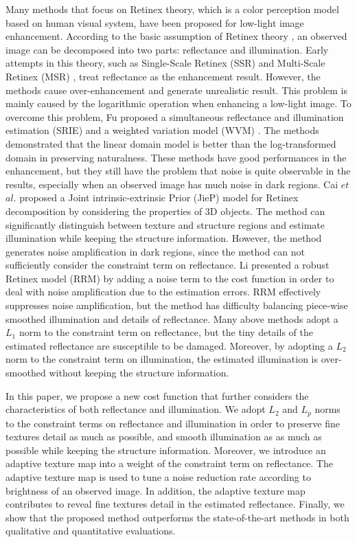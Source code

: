 Many methods that focus on Retinex theory, which is a color perception model based on human visual system, have been proposed for low-light image enhancement. According to the basic assumption of Retinex theory \cite{retinex}, an observed image can be decomposed into two parts: reflectance and illumination. Early attempts in this theory, such as Single-Scale Retinex (SSR) \cite{ssr} and Multi-Scale Retinex (MSR) \cite{msr}, treat reflectance as the enhancement result. However, the methods cause over-enhancement and generate unrealistic result. This problem is mainly caused by the logarithmic operation when enhancing a low-light image. To overcome this problem, Fu proposed a simultaneous reflectance and illumination estimation (SRIE) \cite{srie} and a weighted variation model (WVM) \cite{wvm}. The methods demonstrated that the linear domain model is better than the log-transformed domain in preserving naturalness. These methods have good performances in the enhancement, but they still have the problem that noise is quite observable in the results, especially when an observed image has much noise in dark regions. Cai $et$ $al$. \cite{jiep} proposed a Joint intrinsic-extrinsic Prior (JieP) model for Retinex decomposition by considering the properties of 3D objects. The method can significantly distinguish between texture and structure regions and estimate illumination while keeping the structure information. However, the method generates noise amplification in dark regions, since the method can not sufficiently consider the constraint term on reflectance. Li presented a robust Retinex model (RRM) \cite{rrm} by adding a noise term to the cost function in order to deal with noise amplification due to the estimation errors. RRM effectively suppresses noise amplification, but the method has difficulty balancing piece-wise smoothed illumination and details of reflectance. Many above methods adopt a $L_{1}$ norm to the constraint term on reflectance, but the tiny details of the estimated reflectance are susceptible to be damaged. Moreover, by adopting a $L_{2}$ norm to the constraint term on illumination, the estimated illumination is over-smoothed without keeping the structure information. \par
In this paper, we propose a new cost function that further considers the characteristics of both reflectance and illumination. We adopt $L_{2}$ and $L_{p}$ norms to the constraint terms on reflectance and illumination in order to preserve fine textures detail as much as possible, and smooth illumination as as much as possible while keeping the structure information. Moreover, we introduce an adaptive texture map into a weight of the constraint term on reflectance. The adaptive texture map is used to tune a noise reduction rate according to brightness of an observed image. In addition, the adaptive texture map contributes to reveal fine textures detail in the estimated reflectance. Finally, we show that the proposed method outperforms the state-of-the-art methods in both qualitative and quantitative evaluations.\par